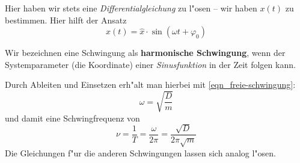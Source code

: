 Hier haben wir stets eine \emph{Differentialgleichung} zu l"osen -- wir
haben $x(t)$ zu bestimmen. Hier hilft der Ansatz
\begin{equation}
   \label{eq:103}
   x(t) = \hat x \cdot \sin(\omega t + \varphi_0)
\end{equation}
\begin{Def}
   \label{def_harmonische-schwingung} Wir bezeichnen eine Schwingung
   als \textbf{harmonische Schwingung}, wenn der Systemparameter (die
   Koordinate) einer \emph{Sinusfunktion} in der Zeit folgen kann.
\end{Def}
Durch Ableiten und Einsetzen erh"alt man hierbei mit \eqref{eqn_freie-schwingung}:
\begin{equation}
   \label{eq:104}
   \omega = \sqrt{\frac{D}{m}}
\end{equation}
und damit eine Schwingfrequenz von 
\begin{equation}
   \label{eq:105}
   \nu = \frac{1}{T} =  \frac{\omega}{2\pi} = \frac{\sqrt{D}}{2\pi \sqrt{m}} 
\end{equation}
Die Gleichungen f"ur die anderen Schwingungen lassen sich analog l"osen.


